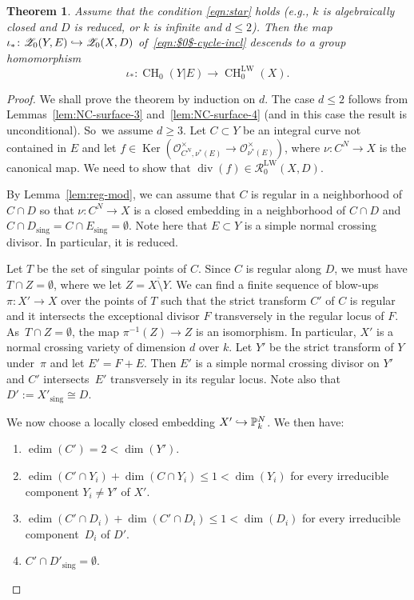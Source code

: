 \documentclass[JEP,XML,SOM,Unicode,published]{cedram}
\let\mathcal\mathscr
\def\hto{\mathrel{\lhook\joinrel\to}}
\let\inj\hto
\newcommand{\LW}{\mathrm{LW}}
\newtheorem{thm}{Theorem}[section]
\theoremstyle{definition}
\newcommand{\lemref}{Lemma~\ref}
\newcommand{\sO}{{\mathcal O}}\let\cO\sO
\newcommand{\sR}{{\mathcal R}}
\newcommand{\sZ}{{\mathcal Z}}
\renewcommand{\P}{{\mathbb P}}
\DeclareMathOperator{\CH}{CH}
\DeclareMathOperator{\divf}{div}
\DeclareMathOperator{\edim}{edim}
\DeclareMathOperator{\Ker}{Ker}
\newcommand{\sing}{\mathrm{sing}}
\let\ov\overline
\begin{document}
\begin{thm}\label{thm:Reg-mod-LW}
Assume that the condition \eqref{eqn:star} holds
(e.g., $k$ is algebraically closed and
$D$ is reduced, or $k$ is infinite and $d \leq 2$).
Then the map $\iota_* \colon \sZ_0(Y, E) \inj \sZ_0(X, D)$ of~\eqref{eqn:$0$-cycle-incl} descends to a group
homomorphism
\[
\iota_* \colon \CH_0(Y|E) \to \CH^{\LW}_0(X).
\]
\end{thm}
\begin{proof}
We shall prove the theorem by induction on $d$.
The case $d \le 2$ follows from Lemmas~\ref{lem:NC-surface-3} and~\ref{lem:NC-surface-4} (and in this case the result is unconditional).
So~we assume $d \ge 3$.
Let $C \subset Y$ be an integral curve not contained in $E$
and let \hbox{$f \in \Ker(\sO^{\times}_{C^N,\nu^*(E)} \to \sO^{\times}_{\nu^*(E)})$},
where $\nu: C^N \to X$ is the canonical map.
We need to show that $\divf(f) \in \sR^{\LW}_0(X,D)$.

By \lemref{lem:reg-mod}, we can assume that $C$ is regular in a
neighborhood of $C \cap D$ so that $\nu:C^N \to X$ is a closed embedding
in a neighborhood of $C \cap D$ and $C \cap D_{\sing} = C \cap E_{\sing} =
\emptyset$. Note here that $E \subset Y$ is a simple normal crossing divisor.
In particular, it is reduced.

Let $T$ be the set of singular points of $C$. Since $C$ is
regular along $D$, we must have $T \cap Z = \emptyset$,
where we let $Z = \ov{X \setminus Y}$.
We can find a finite sequence of blow-ups $\pi: X' \to X$ over the
points of $T$ such that the strict transform $C'$ of $C$ is regular and
it intersects the exceptional divisor $F$ transversely in the regular locus of
$F$. As~$T \cap Z = \emptyset$, the map $\pi^{-1}(Z) \to Z$ is an isomorphism.
In particular, $X'$ is a normal crossing variety of dimension $d$ over $k$.
Let $Y'$ be the strict transform of $Y$ under~$\pi$
and let $E' = F + E$.
Then $E'$ is a simple normal crossing divisor on $Y'$ and $C'$ intersects~$E'$ transversely in its regular locus.
Note also that $D':= X'_\sing \cong D$.

We now choose a locally closed embedding $X' \inj \P^N_k$.
We then have:
\begin{enumerate}
\item\label{enum:b1}
$\edim(C') = 2 < \dim(Y')$.
\item\label{enum:b2}
$\edim(C' \cap Y_i) + \dim(C \cap Y_i) \le 1 < \dim(Y_i)$ for every irreducible
component $Y_i \neq Y'$ of $X'$.
\item\label{enum:b3}
$\edim(C' \cap D_i) + \dim(C' \cap D_i) \le 1 < \dim(D_i)$ for every irreducible
component~$D_i$ of $D'$.
\item\label{enum:b4}
$C' \cap D'_{\sing} = \emptyset$.
\end{enumerate}


\end{proof}
\end{document}
